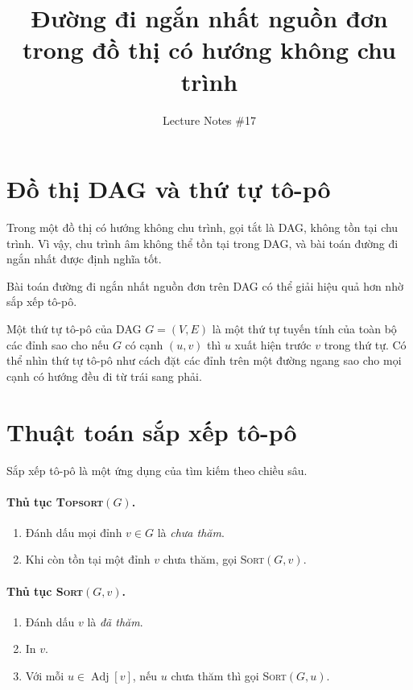 \documentclass[11pt]{article}
\title{Đường đi ngắn nhất nguồn đơn trong đồ thị có hướng không chu trình}
\author{Lecture Notes \#17}
\date{}
\begin{document}
\maketitle


\section{Đồ thị DAG và thứ tự tô-pô}

Trong một đồ thị có hướng không chu trình, gọi tắt là DAG, không tồn tại chu
trình. Vì vậy, chu trình âm không thể tồn tại trong DAG, và bài toán đường đi
ngắn nhất được định nghĩa tốt.

Bài toán đường đi ngắn nhất nguồn đơn trên DAG có thể giải hiệu quả hơn nhờ
sắp xếp tô-pô.

Một thứ tự tô-pô của DAG $G=(V,E)$ là một thứ tự tuyến tính của toàn bộ các
đỉnh sao cho nếu $G$ có cạnh $(u,v)$ thì $u$ xuất hiện trước $v$ trong thứ
tự. Có thể nhìn thứ tự tô-pô như cách đặt các đỉnh trên một đường ngang sao
cho mọi cạnh có hướng đều đi từ trái sang phải.

\section{Thuật toán sắp xếp tô-pô}

Sắp xếp tô-pô là một ứng dụng của tìm kiếm theo chiều sâu.

\paragraph{Thủ tục \textsc{Topsort}$(G)$.}
\begin{enumerate}
  \item Đánh dấu mọi đỉnh $v\in G$ là \emph{chưa thăm}.
  \item Khi còn tồn tại một đỉnh $v$ chưa thăm, gọi
  \textsc{Sort}$(G,v)$.
\end{enumerate}

\paragraph{Thủ tục \textsc{Sort}$(G,v)$.}
\begin{enumerate}
  \item Đánh dấu $v$ là \emph{đã thăm}.
  \item In $v$.
  \item Với mỗi $u\in \operatorname{Adj}[v]$, nếu $u$ chưa thăm thì gọi
  \textsc{Sort}$(G,u)$.
\end{enumerate}
\end{document}
